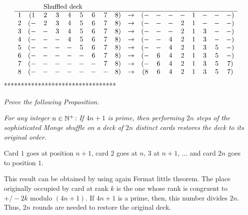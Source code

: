 \begin{itemize}
\begin{enumerate}
{\[\begin{array}{cccccccccccccccccc}
     \multicolumn{8}{c}{\mbox{Shuffled deck}} \\
\hline
1 & (1 & 2 & 3 & 4 & 5 & 6 & 7 & 8) & \rightarrow & ( - & - & - & - & 1 & - &  - & - ) \\
2 & ( - & 2 & 3 & 4 & 5 & 6 & 7 & 8) & \rightarrow & ( - & - & - & 2 & 1 & - & - & - ) \\
3 & ( - & - & 3 & 4 & 5 & 6 & 7 & 8) &  \rightarrow& ( - & - & - & 2 & 1 & 3 & - & - ) \\
4 & ( - & - & - & 4 & 5 & 6 & 7 & 8) &  \rightarrow& ( - & - & 4 & 2 & 1 & 3 & - & - ) \\
5 & ( - & - & - & - & 5 & 6 & 7 & 8) &  \rightarrow& ( - & - & 4 & 2 & 1 & 3 & 5 & - ) \\
6 & ( - & - & - & - & - & 6 & 7 & 8) &  \rightarrow& ( - & 6 & 4 & 2 & 1 & 3 & 5 & - ) \\
7 & ( - & - & - & - & - & - & 7 & 8) &  \rightarrow& ( - & 6 & 4 & 2 & 1 & 3 & 5 & 7 ) \\
8 & ( - & - & - & - & - & - & - & 8) &  \rightarrow& ( 8 & 6 & 4 & 2 & 1 & 3 & 5 & 7 ) \\
\end{array}
\]
*********************************}

{\em Prove the following Proposition.}

{\em For any integer $n \in \mathbb{N}^+$: 
If $4n+1$ is prime, then performing $2n$ steps of the sophisticated Monge shuffle on a deck of $2n$ distinct cards 
restores the deck to its original order.}
\smallskip

Card $1$ goes at position $n+1$, card $2$ goes at $n$, $3$ at $n+1$, ... and card $2n$ goes to position $1$.

This result can be obtained by using again Fermat little theorem.
The place originally occupied by card at rank $k$ is the one whose rank is congruent to $+/- 2k$ modulo $(4n+1)$.
If $4n+1$ is a prime, then, this number divides $2n$.
Thus, $2n$ rounds are needed to restore the original deck. 
\end{enumerate}
  
\end{itemize}




